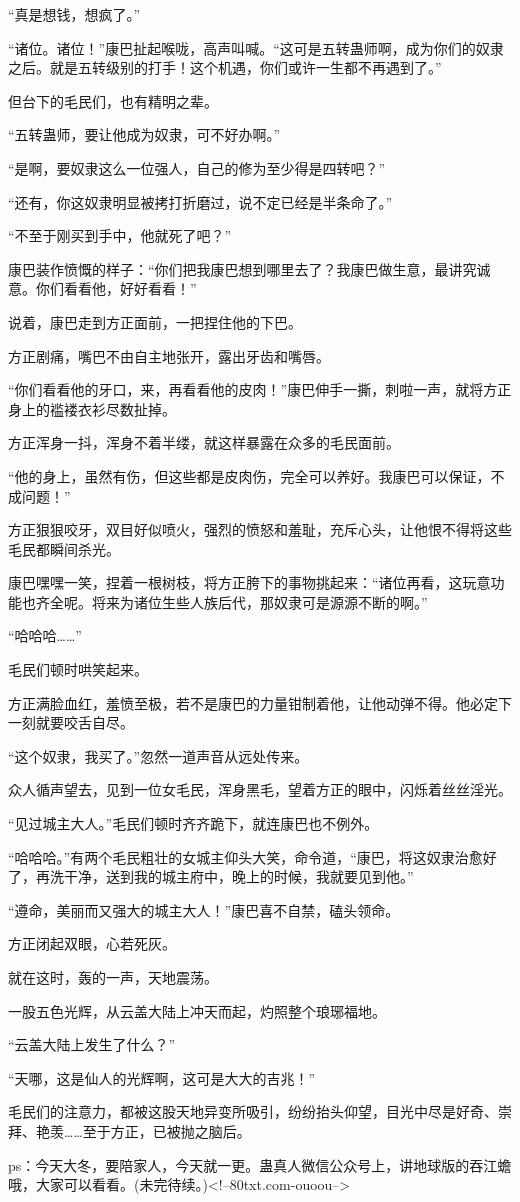 \begin{this_body}
“真是想钱，想疯了。”

“诸位。诸位！”康巴扯起喉咙，高声叫喊。“这可是五转蛊师啊，成为你们的奴隶之后。就是五转级别的打手！这个机遇，你们或许一生都不再遇到了。”

但台下的毛民们，也有精明之辈。

“五转蛊师，要让他成为奴隶，可不好办啊。”

“是啊，要奴隶这么一位强人，自己的修为至少得是四转吧？”

“还有，你这奴隶明显被拷打折磨过，说不定已经是半条命了。”

“不至于刚买到手中，他就死了吧？”

康巴装作愤慨的样子：“你们把我康巴想到哪里去了？我康巴做生意，最讲究诚意。你们看看他，好好看看！”

说着，康巴走到方正面前，一把捏住他的下巴。

方正剧痛，嘴巴不由自主地张开，露出牙齿和嘴唇。

“你们看看他的牙口，来，再看看他的皮肉！”康巴伸手一撕，刺啦一声，就将方正身上的褴褛衣衫尽数扯掉。

方正浑身一抖，浑身不着半缕，就这样暴露在众多的毛民面前。

“他的身上，虽然有伤，但这些都是皮肉伤，完全可以养好。我康巴可以保证，不成问题！”

方正狠狠咬牙，双目好似喷火，强烈的愤怒和羞耻，充斥心头，让他恨不得将这些毛民都瞬间杀光。

康巴嘿嘿一笑，捏着一根树枝，将方正胯下的事物挑起来：“诸位再看，这玩意功能也齐全呢。将来为诸位生些人族后代，那奴隶可是源源不断的啊。”

“哈哈哈……”

毛民们顿时哄笑起来。

方正满脸血红，羞愤至极，若不是康巴的力量钳制着他，让他动弹不得。他必定下一刻就要咬舌自尽。

“这个奴隶，我买了。”忽然一道声音从远处传来。

众人循声望去，见到一位女毛民，浑身黑毛，望着方正的眼中，闪烁着丝丝淫光。

“见过城主大人。”毛民们顿时齐齐跪下，就连康巴也不例外。

“哈哈哈。”有两个毛民粗壮的女城主仰头大笑，命令道，“康巴，将这奴隶治愈好了，再洗干净，送到我的城主府中，晚上的时候，我就要见到他。”

“遵命，美丽而又强大的城主大人！”康巴喜不自禁，磕头领命。

方正闭起双眼，心若死灰。

就在这时，轰的一声，天地震荡。

一股五色光辉，从云盖大陆上冲天而起，灼照整个琅琊福地。

“云盖大陆上发生了什么？”

“天哪，这是仙人的光辉啊，这可是大大的吉兆！”

毛民们的注意力，都被这股天地异变所吸引，纷纷抬头仰望，目光中尽是好奇、崇拜、艳羡……至于方正，已被抛之脑后。

ps：今天大冬，要陪家人，今天就一更。蛊真人微信公众号上，讲地球版的吞江蟾哦，大家可以看看。(未完待续。)<!--80txt.com-ouoou-->

\end{this_body}

